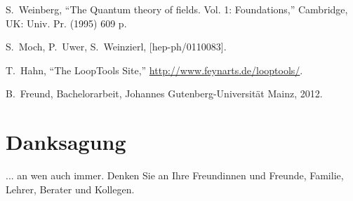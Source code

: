 \documentclass[a4paper,11pt,oneside,final,german,openbib,pdftex]{scrbook}
\begin{document}
\begin{appendix}
\begin{thebibliography}{99}
  S.~Weinberg,
  ``The Quantum theory of fields. Vol. 1: Foundations,''
  Cambridge, UK: Univ. Pr. (1995) 609 p.

  S.~Moch, P.~Uwer, S.~Weinzierl,
  [hep-ph/0110083].

  T.~Hahn, 
  ``The LoopTools Site,''
  \url{http://www.feynarts.de/looptools/}.

  B.~Freund, 
  Bachelorarbeit, Johannes Gutenberg-Universit\"at Mainz, 2012.

\end{thebibliography}

\chapter{Danksagung}

... an wen auch immer. Denken Sie an Ihre Freundinnen und Freunde, 
Familie, Lehrer, Berater und Kollegen.

\end{appendix}
\end{document}
